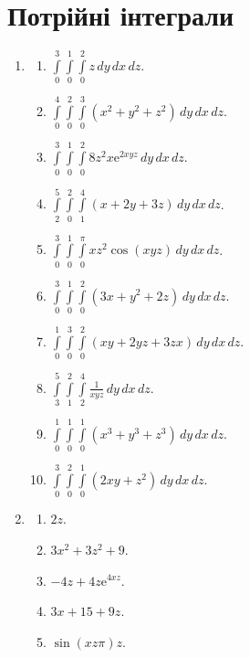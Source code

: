 \section{Потрійні інтеграли}
\begin{enumerate}
    \item
        \begin{multicols}{2}
            \begin{enumerate}[label*=\arabic*.]
                \item $\int\limits_0^3\int\limits_0^1\int\limits_0^2 z \,dy\,dx\,dz$.
                \item $\int\limits_0^4\int\limits_0^2\int\limits_0^3 (x^2 + y^2 + z^2) \,dy\,dx\,dz$.
                \item $\int\limits_0^3\int\limits_0^1\int\limits_0^2 8 z^{2} x {\mathrm e}^{2 x y z} \,dy\,dx\,dz$.
                \item $\int\limits_2^5\int\limits_0^2\int\limits_1^4 (x + 2y + 3z) \,dy\,dx\,dz$.
                \item $\int\limits_0^3\int\limits_0^1\int\limits_0^\pi x z^{2} \cos\left(x y z\right) \,dy\,dx\,dz$.
                \item $\int\limits_0^3\int\limits_0^1\int\limits_0^2 (3x + y^2 + 2z) \,dy\,dx\,dz$.
                \item $\int\limits_0^1\int\limits_0^3\int\limits_0^2 (xy + 2yz + 3zx) \,dy\,dx\,dz$.
                \item $\int\limits_3^5\int\limits_1^2\int\limits_2^4 \frac{1}{xyz} \,dy\,dx\,dz$.
                \item $\int\limits_0^1\int\limits_0^1\int\limits_0^1 (x^3 + y^3 + z^3) \,dy\,dx\,dz$.
                \item $\int\limits_0^3\int\limits_0^2\int\limits_0^1 (2xy + z^2) \,dy\,dx\,dz$.
            \end{enumerate}
        \end{multicols}
    \item
        \begin{multicols}{2}
            \begin{enumerate}[label*=\arabic*.]
                \item $2 z$.
                \item $3 x^{2}+3 z^{2}+9$.
                \item $-4 z+4 z {\mathrm e}^{4 x z}$.
                \item $3 x+15+9 z$.
                \item $\sin\! \left(x z \pi \right) z$.

\end{enumerate}
\end{multicols}
\end{enumerate}
